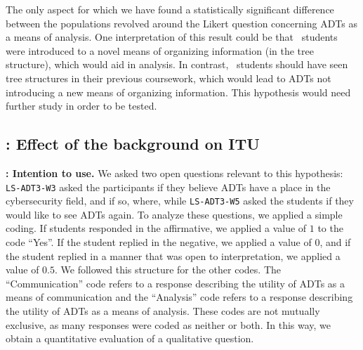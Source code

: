The only aspect for which we have found a statistically significant difference between the populations revolved around the Likert question concerning ADTs as a means of analysis. One interpretation of this result could be that \ICS\ students were introduced to a novel means of organizing information (in the tree structure), which would aid in analysis. In contrast, \SEC\ students should have seen tree structures in their previous coursework, which would lead to ADTs not introducing a new means of organizing information. 
This hypothesis would need further study in order to be tested.







\subsection{: Effect of the background on \textbf{ITU}}\label{sec:rq3}



\textbf{\hypothesis{\hypoIntentionToUse}: Intention to use.}
We asked two open questions relevant to this hypothesis: \texttt{LS-ADT3-W3} asked the participants if they believe ADTs have a place in the cybersecurity field, and if so, where, while \texttt{LS-ADT3-W5} asked the students if they would like to see ADTs again. To analyze these questions, we applied a simple coding. If students responded in the affirmative, we applied a value of $1$ to the code ``Yes''. If the student replied in the negative, we applied a value of $0$, and if the student replied in a manner that was open to interpretation, we applied a value of $0.5$. We followed this structure for the other codes. The ``Communication'' code refers to a response describing the utility of ADTs as a means of communication and the ``Analysis'' code refers to a response describing the utility of ADTs as a means of analysis. These codes are not mutually exclusive, as many responses were coded as neither or both. In this way, we obtain a quantitative evaluation of a qualitative question. 


